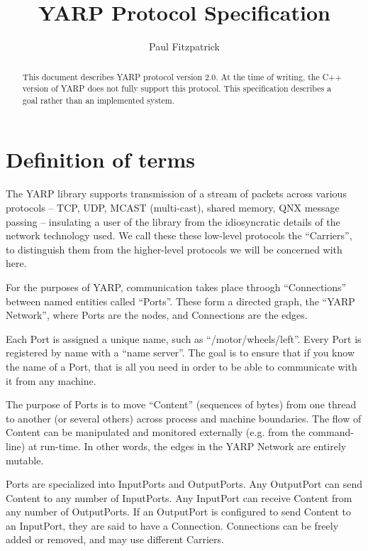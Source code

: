\documentclass[a4]{article}
\title{
YARP Protocol Specification
}
\author{Paul Fitzpatrick}
\begin{document}
\maketitle


\begin{abstract}

This document describes YARP protocol version 2.0.  At the time
of writing, the C++ version of YARP does not fully support this
protocol.  This specification describes a goal rather than an
implemented system.

\end{abstract}




\section{Definition of terms}

The YARP library supports transmission of a stream of packets across
various protocols -- TCP, UDP, MCAST (multi-cast), shared memory, QNX
message passing -- insulating a user of the library from the
idiosyncratic details of the network technology used.  We call these
these low-level protocols the ``Carriers'', to distinguish them from
the higher-level protocols we will be concerned with here.

For the purposes of YARP, communication takes place throogh
``Connections'' between named entities called ``Ports''.
These form a directed graph, the ``YARP Network'', where Ports are the nodes,
and Connections are the edges.

Each Port is assigned a unique name, such as ``/motor/wheels/left''.  
Every Port is registered by name with
a ``name server''.  The goal is to ensure that if you know the name
of a Port, that is all you need in order to be able to 
communicate with it from any machine.

The purpose of Ports is to move ``Content'' (sequences of bytes) from
one thread to another (or several others) across process and machine
boundaries.  The flow of Content can be manipulated and monitored
externally (e.g. from the command-line) at run-time.  In other words,
the edges in the YARP Network are entirely mutable.

Ports are specialized into InputPorts and OutputPorts.
Any OutputPort can send Content to any number of InputPorts.  Any
InputPort can receive Content from any number of OutputPorts.  If an
OutputPort is configured to send Content to an InputPort, they are
said to have a Connection.  Connections can be freely added or 
removed, and may use different Carriers.
\end{document}
